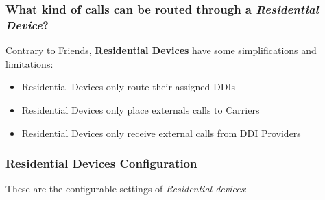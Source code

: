 \documentclass[letterpaper,10pt,english]{sphinxmanual}
\begin{document}
\subsubsection{What kind of calls can be routed through a \emph{Residential Device}?}
\label{administration_portal/client/residential/residential_devices:what-kind-of-calls-can-be-routed-through-a-residential-device}
Contrary to Friends, \textbf{Residential Devices} have some simplifications and limitations:
\begin{itemize}
\item {} 
Residential Devices only route their assigned DDIs

\item {} 
Residential Devices only place externals calls to Carriers

\item {} 
Residential Devices only receive external calls from DDI Providers

\end{itemize}


\subsubsection{Residential Devices Configuration}
\label{administration_portal/client/residential/residential_devices:residential-devices-configuration}
These are the configurable settings of \emph{Residential devices}:
\end{document}

